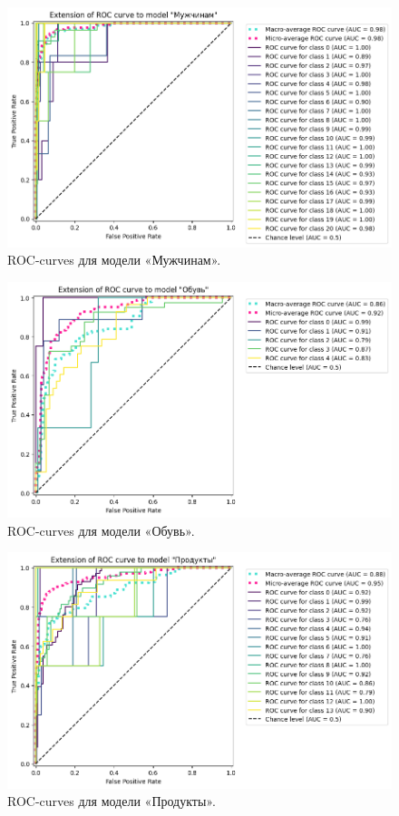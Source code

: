 \documentclass[a4paper,12pt]{extarticle}
\begin{document}
\begin{figure}[hbtp]
	\centering
	\includegraphics[scale=0.7]{roc_curves/roccurve_Мужчинам.png}
	\caption{ROC-curves для модели «Мужчинам».}
	\label{fig:roccurve_Мужчинам}
\end{figure}

\begin{figure}[hbtp]
	\centering
	\includegraphics[scale=0.7]{roc_curves/roccurve_Обувь.png}
	\caption{ROC-curves для модели «Обувь».}
	\label{fig:roccurve_Обувь}
\end{figure}

\begin{figure}[hbtp]
	\centering
	\includegraphics[scale=0.7]{roc_curves/roccurve_Продукты.png}
	\caption{ROC-curves для модели «Продукты».}
	\label{fig:roccurve_Продукты}
\end{figure}
\end{document}
